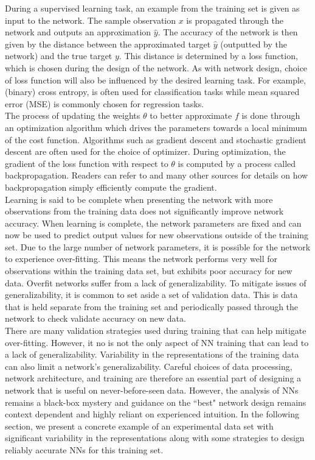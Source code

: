 \documentclass[12pt]{article}
\begin{document}
\indent During a supervised learning task, an example from the training set is given as input to the network. The sample observation $x$ is propagated through the network and outputs an approximation $\hat y$. The accuracy of the network is then given by the distance between the approximated target $\hat y$ (outputted by the network) and the true target $y$. This distance is determined by a loss function, which is chosen during the design of the network. As with network design, choice of loss function will also be influenced by the desired learning task. For example, (binary) cross entropy, is often used for classification tasks while mean squared error (MSE) is commonly chosen for regression tasks. \\
\indent The process of updating the weights $\theta$ to better approximate $f$ is done through an optimization algorithm which drives the parameters towards a local minimum of the cost function. Algorithms such as gradient descent and stochastic gradient descent are often used for the choice of optimizer. During optimization, the gradient of the loss function with respect to $\theta$ is computed by a process called backpropagation. Readers can refer to \cite{bengio} and many other sources for details on how backpropagation simply efficiently compute the gradient.  \\
\indent Learning is said to be complete when presenting the network with more observations from the training data does not significantly improve network accuracy. When learning is complete, the network parameters are fixed and can now be used to predict output values for new observations outside of the training set. Due to the large number of network parameters, it is possible for the network to experience over-fitting. This means the network performs very well for observations within the training data set, but exhibits poor accuracy for new data. Overfit networks suffer from a lack of generalizability. To mitigate issues of generalizability, it is common to set aside a set of validation data. This is data that is held separate from the training set and periodically passed through the network to check validate accuracy on new data.  \\
\indent There are many validation strategies used during training that can help mitigate over-fitting. However, it no is not the only aspect of NN training that can lead to a lack of generalizability. Variability in the representations of the training data can also limit a network's generalizability. Careful choices of data processing, network architecture, and training are therefore an essential part of designing a network that is useful on never-before-seen data. However, the analysis of NNs remains a black-box mystery and guidance on the ``best" network design remains context dependent and highly reliant on experienced intuition. In the following section, we present a concrete example of an experimental data set with significant variability in the representations along with some strategies to design reliably accurate NNs for this training set.
\end{document}
